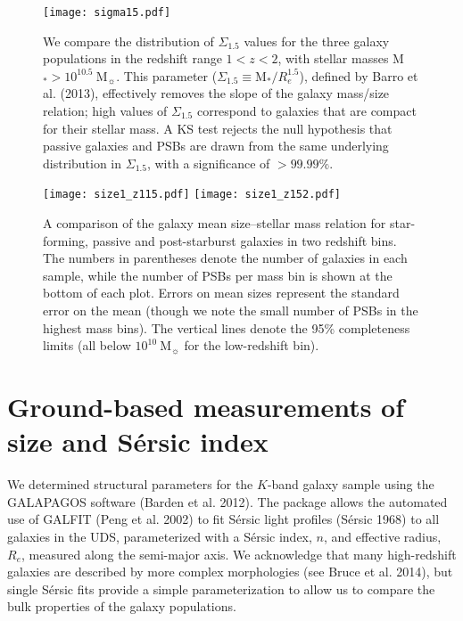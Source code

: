 \documentclass[a4paper,fleqn,usenatbib,useAMS]{mnras}
\begin{document}
\begin{figure}
        \texttt{[image: sigma15.pdf]}
    \caption{We compare the distribution of $\Sigma_{1.5}$ values for
      the three galaxy populations in the redshift range $1<z<2$, with
      stellar masses M$_{\ast}> 10^{10.5} ~$M$_{\sun}$. This parameter
      ($\Sigma_{1.5} \equiv$M$_{\ast}/R_e^{1.5}$), defined by Barro et
      al. (2013), effectively removes the slope of the galaxy
      mass/size relation; high values of $\Sigma_{1.5}$ correspond to
      galaxies that are compact for their stellar mass. A KS test 
      rejects the null hypothesis that passive galaxies and PSBs are
      drawn from the same underlying distribution in $\Sigma_{1.5}$,
      with a significance of $>99.99\%$.}
    \label{fig:sigma15}
\end{figure}


\begin{figure*}
        \texttt{[image: size1\_z115.pdf]}
        \texttt{[image: size1\_z152.pdf]}
    \caption{A comparison of the galaxy mean size--stellar mass
      relation for star-forming, passive and post-starburst galaxies
      in two redshift bins.  The numbers in parentheses denote the
      number of galaxies in each sample, while the number of PSBs per
      mass bin is shown at the bottom of each plot.  Errors on mean
      sizes represent the standard error on the mean (though we note
      the small number of PSBs in the highest mass bins).  The
      vertical lines denote the 95\% completeness limits (all below
      $10^{10} ~$M$_{\sun}$ for the low-redshift bin). }
    \label{fig:size-mass-z12}
\end{figure*}






\section{Ground-based measurements of size and S\'{e}rsic index}
\label{sec:sizesersic}

We determined structural parameters for the $K$-band galaxy sample
using the \textsc{GALAPAGOS} software (Barden et al. 2012).  The
package allows the automated use of \textsc{GALFIT} (Peng et al. 2002)
to fit S\'{e}rsic light profiles (S\'{e}rsic 1968) to all galaxies in
the UDS, parameterized with a S\'{e}rsic index, $n$, and effective
radius, $R_e$, measured along the semi-major axis.  We acknowledge
that many high-redshift galaxies are described by more complex
morphologies (see Bruce et al. 2014), but single S\'{e}rsic fits
provide a simple parameterization to allow us to compare the bulk
properties of the galaxy populations.
\end{document}
